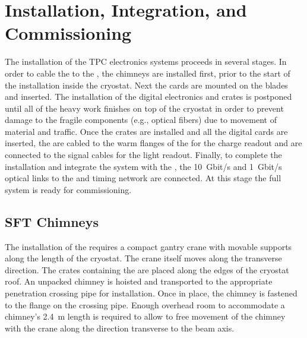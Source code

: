\section{Installation, Integration, and Commissioning}
\label{sec:dp-tpcelec-install}

The installation of the TPC electronics systems proceeds in several stages. In order to cable the  to the , the chimneys are installed first, prior to the start of the  installation inside the cryostat. Next the  cards are mounted on the blades and inserted. The installation of the digital electronics and  crates is postponed until all of the heavy work finishes on top of the cryostat in order to prevent damage to the fragile components (e.g., optical fibers) due to movement of material and traffic. 
Once the  crates are installed and all the digital cards are inserted, the  are cabled to the warm flanges of the  for the charge readout and are connected to the  signal cables for the light readout. Finally, to complete the installation and integrate the system with the , the \SI{10}{Gbit/s} and \SI{1}{Gbit/s} optical links to the  and  timing network are connected. At this stage the full system is ready for commissioning. 

\subsection{SFT Chimneys}
\label{sec:dp-tpcelec-install-sft}

The installation of the  requires a compact gantry crane with %
movable supports along the length of the cryostat. The crane itself moves along the transverse direction. The crates containing the  are placed along the edges of the cryostat roof. An unpacked chimney is hoisted and transported to %
the appropriate penetration crossing pipe for installation. Once in place, the chimney is fastened to the flange on the crossing pipe. %
Enough overhead room to accommodate a chimney's \SI{2.4}{m} length is required
to allow to free movement of the chimney with the crane along the direction transverse to the beam axis. 

